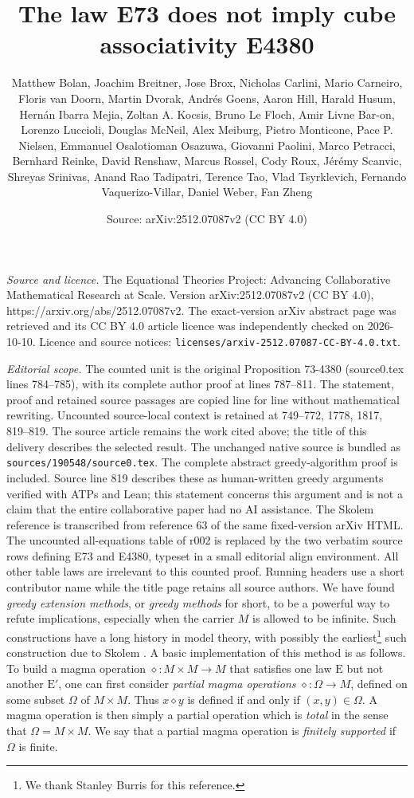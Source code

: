 \documentclass[10pt,a4paper]{amsart}
\title{The law E73 does not imply cube associativity E4380}
\author[ETP contributors]{Matthew Bolan, Joachim Breitner, Jose Brox, Nicholas Carlini, Mario Carneiro, Floris van Doorn, Martin Dvorak, Andr\'es Goens, Aaron Hill, Harald Husum, Hern\'an Ibarra Mejia, Zoltan A. Kocsis, Bruno Le Floch, Amir Livne Bar-on, Lorenzo Luccioli, Douglas McNeil, Alex Meiburg, Pietro Monticone, Pace P. Nielsen, Emmanuel Osalotioman Osazuwa, Giovanni Paolini, Marco Petracci, Bernhard Reinke, David Renshaw, Marcus Rossel, Cody Roux, J\'er\'emy Scanvic, Shreyas Srinivas, Anand Rao Tadipatri, Terence Tao, Vlad Tsyrklevich, Fernando Vaquerizo-Villar, Daniel Weber, Fan Zheng}
\date{Source: arXiv:2512.07087v2 (CC BY 4.0)}
\newcommand{\E}{\mathrm{E}}
\newcommand{\op}{\diamond}
\begin{document}
\maketitle

\noindent\emph{Source and licence.} The Equational Theories Project: Advancing Collaborative Mathematical Research at Scale. Version arXiv:2512.07087v2 (CC BY 4.0), https://arxiv.org/abs/2512.07087v2. The exact-version arXiv abstract page was retrieved and its CC BY 4.0 article licence was independently checked on 2026-10-10. Licence and source notices: \texttt{licenses/arxiv-2512.07087-CC-BY-4.0.txt}.\par\smallskip

\noindent\textit{Editorial scope.} The counted unit is the original Proposition 73-4380 (source0.tex lines 784--785), with its complete author proof at lines 787--811. The statement, proof and retained source passages are copied line for line without mathematical rewriting. Uncounted source-local context is retained at 749--772, 1778, 1817, 819--819. The source article remains the work cited above; the title of this delivery describes the selected result. The unchanged native source is bundled as \texttt{sources/190548/source0.tex}. The complete abstract greedy-algorithm proof is included. Source line 819 describes these as human-written greedy arguments verified with ATPs and Lean; this statement concerns this argument and is not a claim that the entire collaborative paper had no AI assistance. The Skolem reference is transcribed from reference 63 of the same fixed-version arXiv HTML. The uncounted all-equations table of r002 is replaced by the two verbatim source rows defining E73 and E4380, typeset in a small editorial align environment. All other table laws are irrelevant to this counted proof. Running headers use a short contributor name while the title page retains all source authors.
We have found \emph{greedy extension methods}, or \emph{greedy methods} for short, to be a powerful way to refute implications, especially when the carrier $M$ is allowed to be infinite.  Such constructions have a long history in model theory, with possibly the earliest\footnote{We thank Stanley Burris for this reference.} such construction due to Skolem \cite{skolem}. A basic implementation of this method is as follows.  To build a magma operation $\op \colon M \times M \to M$ that satisfies one law $\E$ but not another ${\E'}$, one can first consider \emph{partial magma operations} $\op \colon \Omega \to M$, defined on some subset $\Omega$ of $M \times M$. Thus $x \op y$ is defined if and only if $(x,y) \in \Omega$. A magma operation is then simply a partial operation which is \emph{total} in the sense that $\Omega = M \times M$.  We say that a partial magma operation is \emph{finitely supported} if $\Omega$ is finite.
\end{document}
